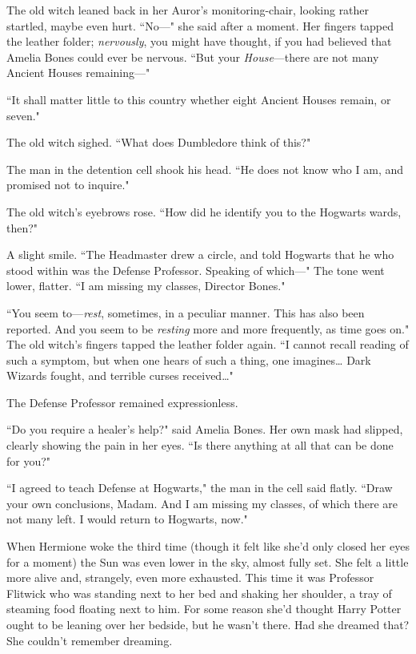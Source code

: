The old witch leaned back in her Auror's monitoring-chair, looking rather startled, maybe even hurt. ``No—" she said after a moment. Her fingers tapped the leather folder; \emph{nervously}, you might have thought, if you had believed that Amelia Bones could ever be nervous. ``But your \emph{House}—there are not many Ancient Houses remaining—"

``It shall matter little to this country whether eight Ancient Houses remain, or seven."

The old witch sighed. ``What does Dumbledore think of this?"

The man in the detention cell shook his head. ``He does not know who I am, and promised not to inquire."

The old witch's eyebrows rose. ``How did he identify you to the Hogwarts wards, then?"

A slight smile. ``The Headmaster drew a circle, and told Hogwarts that he who stood within was the Defense Professor. Speaking of which—" The tone went lower, flatter. ``I am missing my classes, Director Bones."

``You seem to—\emph{rest}, sometimes, in a peculiar manner. This has also been reported. And you seem to be \emph{resting} more and more frequently, as time goes on." The old witch's fingers tapped the leather folder again. ``I cannot recall reading of such a symptom, but when one hears of such a thing, one imagines{\ldots} Dark Wizards fought, and terrible curses received{\ldots}"

The Defense Professor remained expressionless.

``Do you require a healer's help?" said Amelia Bones. Her own mask had slipped, clearly showing the pain in her eyes. ``Is there anything at all that can be done for you?"

``I agreed to teach Defense at Hogwarts," the man in the cell said flatly. ``Draw your own conclusions, Madam. And I am missing my classes, of which there are not many left. I would return to Hogwarts, now."

\later

When Hermione woke the third time (though it felt like she'd only closed her eyes for a moment) the Sun was even lower in the sky, almost fully set. She felt a little more alive and, strangely, even more exhausted. This time it was Professor Flitwick who was standing next to her bed and shaking her shoulder, a tray of steaming food floating next to him. For some reason she'd thought Harry Potter ought to be leaning over her bedside, but he wasn't there. Had she dreamed that? She couldn't remember dreaming.

